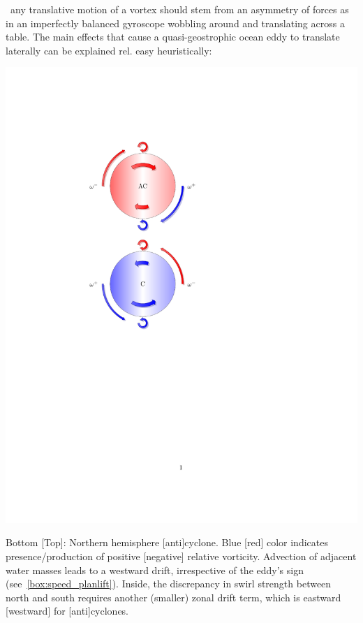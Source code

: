 ~any translative motion of a vortex should stem from an asymmetry of forces as in an imperfectly balanced gyroscope wobbling around and translating across a table.
The main effects that cause a quasi-geostrophic ocean eddy to translate laterally can be explained rel. easy heuristically:

\begin{marginfigure}
\includegraphics[width=1\textwidth]{eddyTikz}
\caption{Bottom [Top]: Northern hemisphere [anti]cyclone. Blue [red] color indicates presence/production of positive [negative] relative vorticity. Advection of adjacent water masses leads to a westward drift, irrespective of the eddy's sign (see~\cref{box:speed_planlift}). Inside, the discrepancy in swirl strength between north and south requires another (smaller) zonal drift term, which is eastward [westward] for [anti]cyclones. }
\label{fig:eddyTikz}
\end{marginfigure}


